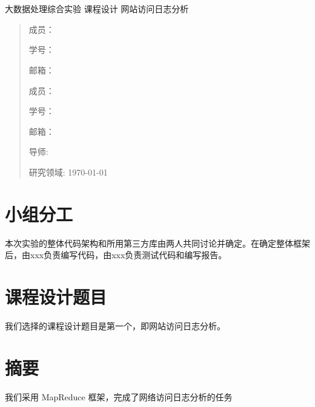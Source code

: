 \documentclass{article}
\date{}
\begin{document}
	\begin{center}
		\quad \\
		\quad \\
		\heiti \fontsize{30}{17} 大数据处理综合实验
		\vskip 0.5cm
		\heiti \fontsize{45}{17} 课\quad 程\quad 设\quad 计
		\vskip 3.5cm
		\heiti {} 网站访问日志分析
	\end{center}
	\vskip 3.5cm

	\begin{quotation}
		\songti \fontsize{15}{15}
		\doublespacing
		\par\setlength\parindent{9em}
		\quad 

		成员：\underline{}
		
		学号：\underline{}
				
		邮箱：\underline{}

    成员：\underline{}
		
		学号：\underline{}
				
		邮箱：\underline{}
    
    导师: \underline{}

    研究领域: \underline{}
		\vskip 2cm
		\centering
		\today
	\end{quotation}
	
	\newpage
	
	\tableofcontents
  
  \newpage
  \section{小组分工}
  
  本次实验的整体代码架构和所用第三方库由两人共同讨论并确定。在确定整体框架后，由xxx负责编写代码，由xxx负责测试代码和编写报告。
  
  \section{课程设计题目}

  我们选择的课程设计题目是第一个，即网站访问日志分析。

  \section{摘要}
  我们采用 MapReduce 框架，完成了网络访问日志分析的任务
\end{document}
